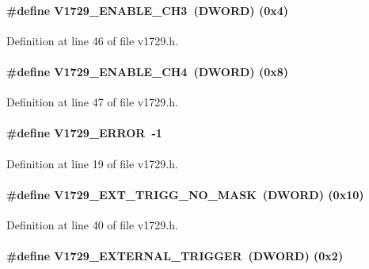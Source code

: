 \paragraph[{V1729\_\-ENABLE\_\-CH3}]{\setlength{\rightskip}{0pt plus 5cm}\#define V1729\_\-ENABLE\_\-CH3~({\bf DWORD})   (0x4)}\hfill\label{v1729_8h_ab32a6035d5102fd9a94604e379e0ba1e}


Definition at line 46 of file v1729.h.
\paragraph[{V1729\_\-ENABLE\_\-CH4}]{\setlength{\rightskip}{0pt plus 5cm}\#define V1729\_\-ENABLE\_\-CH4~({\bf DWORD})   (0x8)}\hfill\label{v1729_8h_aaf6193baab990d303e55835a80827837}


Definition at line 47 of file v1729.h.
\paragraph[{V1729\_\-ERROR}]{\setlength{\rightskip}{0pt plus 5cm}\#define V1729\_\-ERROR~-\/1}\hfill\label{v1729_8h_a112826ffbc2d519ca15ddb2e6149c14c}


Definition at line 19 of file v1729.h.
\paragraph[{V1729\_\-EXT\_\-TRIGG\_\-NO\_\-MASK}]{\setlength{\rightskip}{0pt plus 5cm}\#define V1729\_\-EXT\_\-TRIGG\_\-NO\_\-MASK~({\bf DWORD})  (0x10)}\hfill\label{v1729_8h_a95704b19c95a3838b6d31647963d6ad7}


Definition at line 40 of file v1729.h.
\paragraph[{V1729\_\-EXTERNAL\_\-TRIGGER}]{\setlength{\rightskip}{0pt plus 5cm}\#define V1729\_\-EXTERNAL\_\-TRIGGER~({\bf DWORD})   (0x2)}\hfill\label{v1729_8h_a2a533fc06fcab23838d968b674286532}


